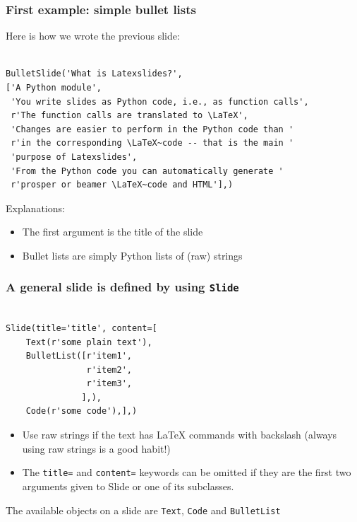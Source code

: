 \documentclass{beamer}
\begin{document}
\begin{frame}[fragile]
\frametitle{First example: simple bullet lists}

\begin{block}{Here is how we wrote the previous slide:}

\begin{Verbatim}[fontsize=\footnotesize,tabsize=4,baselinestretch=0.85,fontfamily=tt,xleftmargin=7mm]

BulletSlide('What is Latexslides?',
['A Python module',
 'You write slides as Python code, i.e., as function calls',
 r'The function calls are translated to \LaTeX',
 'Changes are easier to perform in the Python code than '
 r'in the corresponding \LaTeX~code -- that is the main '
 'purpose of Latexslides',
 'From the Python code you can automatically generate '
 r'prosper or beamer \LaTeX~code and HTML'],)
\end{Verbatim}


\end{block}
\begin{block}{Explanations:}

\begin{itemize}
\item The first argument is the title of the slide
\item Bullet lists are simply Python lists of (raw) strings
\end{itemize}

\end{block}

\end{frame}

\begin{frame}[fragile]
\frametitle{A general slide is defined by using \texttt{Slide}}

\begin{block}

\begin{Verbatim}[fontsize=\footnotesize,tabsize=4,baselinestretch=0.85,fontfamily=tt,xleftmargin=7mm]

Slide(title='title', content=[
    Text(r'some plain text'),
    BulletList([r'item1',
                r'item2',
                r'item3',
               ],),
    Code(r'some code'),],)
\end{Verbatim}


\end{block}
\begin{block}

\begin{itemize}
\item Use raw strings if the text has \LaTeX{} commands with backslash (always using raw strings is a good habit!)
\item The \texttt{title=} and \texttt{content=} keywords can be omitted if they are the first two arguments given to Slide or one of its subclasses.
\end{itemize}

\end{block}
The available objects on a slide are \texttt{Text}, \texttt{Code} and \texttt{BulletList}

\end{frame}
\end{document}
